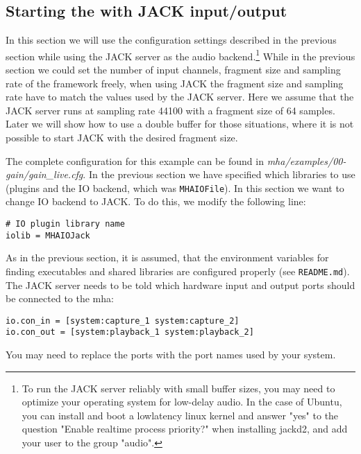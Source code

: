 
\subsection{Starting the \mhad{} with JACK input/output}%
\label{sec:example_jack}%
%
%
%

In this section we will use the configuration settings described in
the previous section while using the JACK server as the audio
backend.\footnote{To run the JACK server reliably with small buffer
  sizes, you may need to optimize your operating system for low-delay
  audio. In the case of Ubuntu, you can install and boot a lowlatency
  linux kernel and answer "yes" to the question "Enable realtime process
  priority?" when installing jackd2, and add your user to the group
  "audio".
}
%
While in the previous section
we could  set the number of 
input channels, fragment size and sampling rate of the framework freely,
when using JACK the fragment size
and sampling rate have to match the values used by the JACK server.
%
Here we assume that the JACK server runs at sampling rate 44100 with a
fragment size of 64 samples.
%
Later we will show how to use a double buffer for those
situations, where it is not possible to start JACK with the desired
fragment size. 

The complete configuration for this example can be found in
\emph{mha/examples/00-gain/gain\_live.cfg}.
In the previous section we have specified which libraries to use
(plugins and the IO backend, which was \verb!MHAIOFile!). In this section 
we want to change IO backend to JACK. 
%
To do this, we modify the following line:
\begin{verbatim}
# IO plugin library name
iolib = MHAIOJack
\end{verbatim}
%
As in the previous section, it is assumed, that the environment
variables for finding executables and shared libraries are configured
properly (see \verb!README.md!).
The JACK server needs to be told which hardware input and output ports should be
connected to the mha:
\begin{verbatim}
io.con_in = [system:capture_1 system:capture_2]
io.con_out = [system:playback_1 system:playback_2]
\end{verbatim}
You may need to replace the ports with the port names used
by your system.
%
